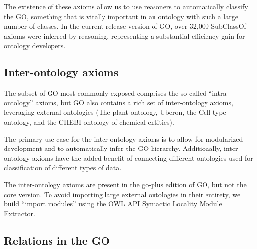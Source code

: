 \documentclass{llncs}
\begin{document}
The existence of these axioms allow us to use reasoners to
automatically classify the GO, something that is vitally important in
an ontology with such a large number of classes. In the current
release version of GO, over 32,000 SubClassOf axioms were inferred by
reasoning, representing a substantial efficiency gain for ontology
developers. 




\subsection{Inter-ontology axioms}

The subset of GO most commonly exposed comprises the so-called
``intra-ontology'' axioms, but GO also contains a rich set of
inter-ontology axioms, leveraging external ontologies (The plant
ontology, Uberon, the Cell type ontology, and the CHEBI ontology of
chemical entities).

The primary use case for the inter-ontology axioms is to allow for
modularized development and to automatically infer the GO
hierarchy. Additionally, inter-ontology axioms have the added benefit
of connecting different ontologies used for classification of
different types of data.

The inter-ontology axioms are present in the go-plus edition of GO,
but not the core version. To avoid importing large external ontologies
in their entirety, we build ``import modules'' using the OWL API
Syntactic Locality Module Extractor.

\subsection{Relations in the GO}
\end{document}
